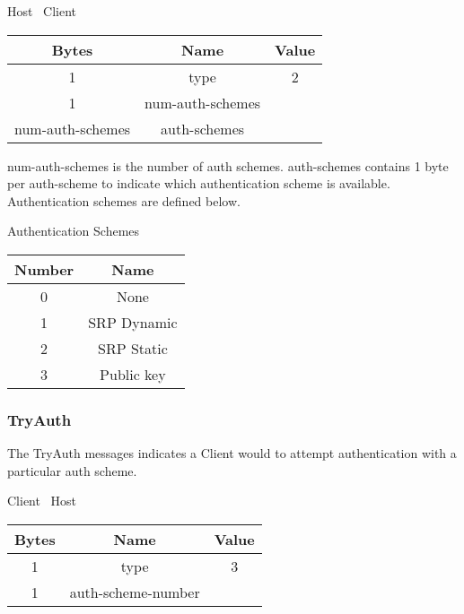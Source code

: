 \begin{center}
    Host \textrightarrow\ Client\\
    \begin{tabular}{|c|c|c|}
        \hline
        \textbf{Bytes}   & \textbf{Name}    & \textbf{Value} \\
        \hline
        1                & type             & 2              \\
        \hline
        1                & num-auth-schemes &                \\
        \hline
        num-auth-schemes & auth-schemes     &                \\
        \hline
    \end{tabular}
\end{center}

num-auth-schemes is the number of auth schemes.
auth-schemes contains 1 byte per auth-scheme to indicate which authentication scheme is available.
Authentication schemes are defined below.\\

\begin{center}
    Authentication Schemes\\
    \begin{tabular}{|c|c|}
        \hline
        \textbf{Number} & \textbf{Name} \\
        \hline
        0               & None          \\
        \hline
        1               & SRP Dynamic   \\
        \hline
        2               & SRP Static    \\
        \hline
        3               & Public key    \\
        \hline
    \end{tabular}
\end{center}

\subsubsection{TryAuth}

The TryAuth messages indicates a Client would to attempt authentication with a particular auth scheme.

\begin{center}
    Client \textrightarrow\ Host\\
    \begin{tabular}{|c|c|c|}
        \hline
        \textbf{Bytes} & \textbf{Name}      & \textbf{Value} \\
        \hline
        1              & type               & 3              \\
        \hline
        1              & auth-scheme-number &                \\
        \hline
    \end{tabular}
\end{center}

